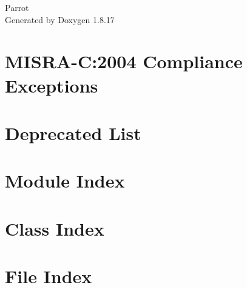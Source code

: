 \let\mypdfximage\pdfximage\def\pdfximage{\immediate\mypdfximage}\documentclass[twoside]{book}
\newcommand{\+}{\discretionary{\mbox{\scriptsize$\hookleftarrow$}}{}{}}
\newcommand{\clearemptydoublepage}{%
  \newpage{\pagestyle{empty}\cleardoublepage}%
}
\begin{document}
\hypersetup{pageanchor=false,
             bookmarksnumbered=true,
             pdfencoding=unicode
            }
\begin{titlepage}
\vspace*{7cm}
\begin{center}%
{\Large Parrot }\\
\vspace*{1cm}
{\large Generated by Doxygen 1.8.17}\\
\end{center}
\end{titlepage}
\clearemptydoublepage
{}
\tableofcontents
\clearemptydoublepage
{}
\hypersetup{pageanchor=true}

\chapter{M\+I\+S\+R\+A-\/C\+:2004 Compliance Exceptions}
\label{CMSIS_MISRA_Exceptions}

\chapter{Deprecated List}
\label{deprecated}

\chapter{Module Index}

\chapter{Class Index}

\chapter{File Index}

\end{document}
